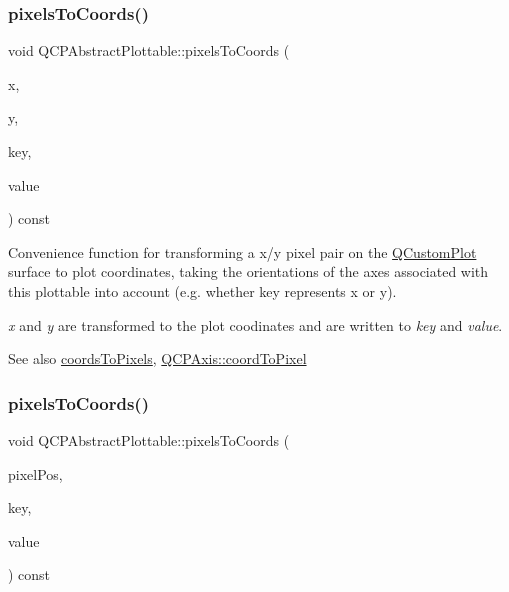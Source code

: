\mbox{\label{class_q_c_p_abstract_plottable_a3903c1120ab5c27e7fa46b597ef267bd}} 
\subsubsection{\texorpdfstring{pixels\+To\+Coords()}{pixelsToCoords()}\hspace{0.1cm}{\footnotesize\ttfamily [1/2]}}
{\footnotesize\ttfamily void Q\+C\+P\+Abstract\+Plottable\+::pixels\+To\+Coords (\begin{DoxyParamCaption}\item[{double}]{x,  }\item[{double}]{y,  }\item[{double \&}]{key,  }\item[{double \&}]{value }\end{DoxyParamCaption}) const}

Convenience function for transforming a x/y pixel pair on the \hyperlink{class_q_custom_plot}{Q\+Custom\+Plot} surface to plot coordinates, taking the orientations of the axes associated with this plottable into account (e.\+g. whether key represents x or y).

{\itshape x} and {\itshape y} are transformed to the plot coodinates and are written to {\itshape key} and {\itshape value}.

\begin{DoxySeeAlso}{See also}
\hyperlink{class_q_c_p_abstract_plottable_a7ad84a36472441cf1f555c5683d0da93}{coords\+To\+Pixels}, \hyperlink{class_q_c_p_axis_af15d1b3a7f7e9b53d759d3ccff1fe4b4}{Q\+C\+P\+Axis\+::coord\+To\+Pixel} 
\end{DoxySeeAlso}
\mbox{\label{class_q_c_p_abstract_plottable_a28d32c0062b9450847851ffdee1c5f69}} 
\subsubsection{\texorpdfstring{pixels\+To\+Coords()}{pixelsToCoords()}\hspace{0.1cm}{\footnotesize\ttfamily [2/2]}}
{\footnotesize\ttfamily void Q\+C\+P\+Abstract\+Plottable\+::pixels\+To\+Coords (\begin{DoxyParamCaption}\item[{const Q\+PointF \&}]{pixel\+Pos,  }\item[{double \&}]{key,  }\item[{double \&}]{value }\end{DoxyParamCaption}) const}


